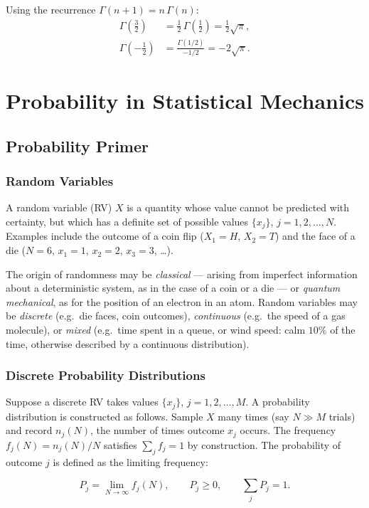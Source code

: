 Using the recurrence $\Gamma(n+1) = n\,\Gamma(n)$:
\begin{align}
    \Gamma\!\left(\tfrac{3}{2}\right) &= \tfrac{1}{2}\,\Gamma\!\left(\tfrac{1}{2}\right) = \tfrac{1}{2}\sqrt{\pi}, \\
    \Gamma\!\left(-\tfrac{1}{2}\right) &= \frac{\Gamma(1/2)}{-1/2} = -2\sqrt{\pi}.
\end{align}

\chapter{Probability in Statistical Mechanics}

\section{Probability Primer}

\subsection{Random Variables}

\begin{definition}
A random variable (RV) $X$ is a quantity whose value cannot be predicted with certainty, but which has a definite set of possible values $\{x_j\}$, $j = 1, 2, \ldots, N$. Examples include the outcome of a coin flip ($X_1 = H$, $X_2 = T$) and the face of a die ($N = 6$, $x_1 = 1$, $x_2 = 2$, $x_3 = 3$, \ldots).
\end{definition}

The origin of randomness may be \emph{classical} — arising from imperfect information about a deterministic system, as in the case of a coin or a die — or \emph{quantum mechanical}, as for the position of an electron in an atom. Random variables may be \emph{discrete} (e.g.\ die faces, coin outcomes), \emph{continuous} (e.g.\ the speed of a gas molecule), or \emph{mixed} (e.g.\ time spent in a queue, or wind speed: calm $10\%$ of the time, otherwise described by a continuous distribution).

\subsection{Discrete Probability Distributions}

Suppose a discrete RV takes values $\{x_j\}$, $j = 1, 2, \ldots, M$. A probability distribution is constructed as follows. Sample $X$ many times (say $N \gg M$ trials) and record $n_j(N)$, the number of times outcome $x_j$ occurs. The frequency $f_j(N) = n_j(N)/N$ satisfies $\sum_j f_j = 1$ by construction. The probability of outcome $j$ is defined as the limiting frequency:
\begin{definition}
\begin{equation}
    P_j = \lim_{N\to\infty} f_j(N), \qquad P_j \ge 0, \qquad \sum_j P_j = 1.
\end{equation}
\end{definition}

